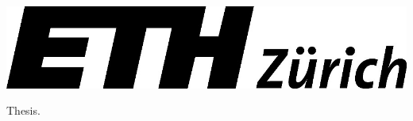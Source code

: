 \documentclass[a4paper]{article}
\begin{document}
\includegraphics{assets/eth-logo.png}






Thesis.


\end{document}
